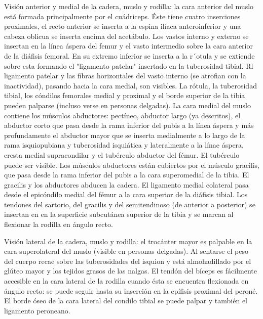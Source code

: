 Visión anterior y medial de la cadera, muslo y rodilla: la cara anterior del muslo está formada principalmente por el cuádriceps. Éste tiene cuatro inserciones proximales, el recto anterior se inserta a la espina ilíaca anteroinferior y una cabeza oblicua se inserta encima del acetábulo. Los vastos interno y externo se insertan en la línea áspera del femur y el vasto intermedio sobre la cara anterior de la diáfisis femoral. En su extremo inferior se inserta a la r´otula y se extiende sobre esta formando el "ligamento patelar" insertado en la tuberosidad tibial. Rl ligamento patelar y las fibras horizontales del vasto interno (se atrofian con la inactividad), pasando hacia la cara medial, son visibles. La rótula, la tuberosidad tibial, los cóndilos femorales medial y proximal y el borde superior de la tibia pueden palparse (incluso verse en personas delgadas).
La cara medial del muslo contiene los músculos abductores: pectíneo, abductor largo (ya descritos), el abductor corto que pasa desde la rama inferior del pubis a la línea áspera y más profundamente el abductor mayor que se inserta medialmente a lo largo de la rama isquiopubiana y tuberosidad isquiática y lateralmente a la línae áspera, cresta medial supracondilar y el tubérculo abductor del fémur. El tubérculo puede ser visible.
Los músculos abductores están cubiertos por el músculo gracilis, que pasa desde la rama inferior del pubis a la cara superomedial de la tibia. El gracilis y los abductores abducen la cadera.
El ligamento medial colateral pasa desde el epicóndilo medial del fémur a la cara superior de la diáfisis tibial. Los tendones del sartorio, del gracilis y del semitendinoso (de anterior a posterior) se insertan en en la superficie subcutánea superior de la tibia y se marcan al flexionar la rodilla en ángulo recto.

Visión lateral de la cadera, muslo y rodilla: el trocánter mayor es palpable en la cara superolateral del muslo (visible en personas delgadas). Al sentarse el peso del cuerpo recae sobre las tuberosidades del isquion y está almohadillado por el glúteo mayor y los tejidos grasos de las nalgas.
El tendón del bíceps es fácilmente accesible en la cara lateral de la rodilla cuando ésta se encuentra flexionada en ángulo recto: se puede seguir hasta su inserción en la epífisis proximal del peroné. El borde óseo de la cara lateral del condilo tibial se puede palpar y también el ligamento peroneano.

